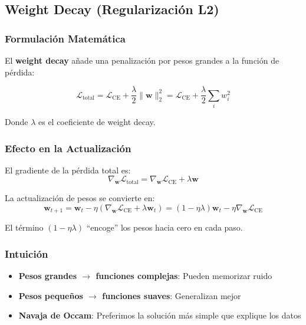 \documentclass[12pt,a4paper]{article}
\begin{document}
\subsection{Weight Decay (Regularización L2)}

\subsubsection{Formulación Matemática}

El \textbf{weight decay} añade una penalización por pesos grandes a la función de pérdida:

\begin{equation}
\mathcal{L}_{\text{total}} = \mathcal{L}_{\text{CE}} + \frac{\lambda}{2} \|\mathbf{w}\|_2^2 = \mathcal{L}_{\text{CE}} + \frac{\lambda}{2} \sum_i w_i^2
\end{equation}

Donde $\lambda$ es el coeficiente de weight decay.

\subsubsection{Efecto en la Actualización}

El gradiente de la pérdida total es:
\begin{equation}
\nabla_{\mathbf{w}} \mathcal{L}_{\text{total}} = \nabla_{\mathbf{w}} \mathcal{L}_{\text{CE}} + \lambda \mathbf{w}
\end{equation}

La actualización de pesos se convierte en:
\begin{equation}
\mathbf{w}_{t+1} = \mathbf{w}_t - \eta (\nabla_{\mathbf{w}} \mathcal{L}_{\text{CE}} + \lambda \mathbf{w}_t) = (1 - \eta\lambda)\mathbf{w}_t - \eta \nabla_{\mathbf{w}} \mathcal{L}_{\text{CE}}
\end{equation}

El término $(1 - \eta\lambda)$ ``encoge'' los pesos hacia cero en cada paso.

\subsubsection{Intuición}

\begin{itemize}
    \item \textbf{Pesos grandes $\rightarrow$ funciones complejas}: Pueden memorizar ruido
    \item \textbf{Pesos pequeños $\rightarrow$ funciones suaves}: Generalizan mejor
    \item \textbf{Navaja de Occam}: Preferimos la solución más simple que explique los datos
\end{itemize}
\end{document}
